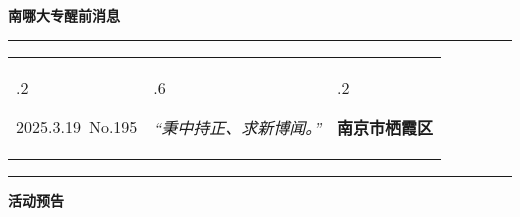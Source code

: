 \documentclass[letterpaper, 12pt]{article}
\begin{document}
\begin{center}
    \Huge\textbf{南哪大专醒前消息}
\end{center}
\vspace{4mm}
\hrule
\renewcommand\tabularxcolumn[1]{m{#1}}
\begin{tabularx}{\textwidth}{>{\hsize.2\hsize}X>{\hsize.6\hsize}X>{\hsize.2\hsize}X}
    \begin{flushleft}
        2025.3.19\, No.195
    \end{flushleft}
    &
    \begin{center}
        \textit{“秉中持正、求新博闻。”}
    \end{center}
    &
    \begin{flushright}
        \textbf{南京市栖霞区}
    \end{flushright}
\end{tabularx}
\vspace{-3.5mm}
\hrule
\vspace{4mm}
\centerline{\huge\textbf{活动预告}}
\end{document}
